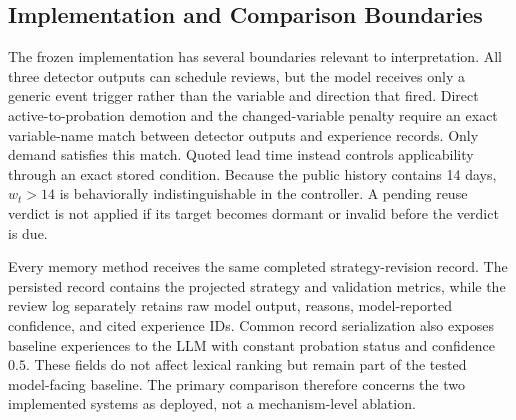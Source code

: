 \subsection{Implementation and Comparison Boundaries}
\label{sec:method-boundaries}

The frozen implementation has several boundaries relevant to interpretation.
All three detector outputs can schedule reviews, but the model receives only a
generic event trigger rather than the variable and direction that fired. Direct
active-to-probation demotion and the changed-variable penalty require an exact
variable-name match between detector outputs and experience records. Only
demand satisfies this match. Quoted lead time instead controls applicability
through an exact stored condition. Because the public history contains 14 days,
$w_t>14$ is behaviorally indistinguishable in the controller. A pending reuse
verdict is not applied if its target becomes dormant or invalid before the
verdict is due.

Every memory method receives the same completed strategy-revision record. The
persisted record contains the projected strategy and validation metrics, while
the review log separately retains raw model output, reasons, model-reported
confidence, and cited experience IDs. Common record serialization also exposes
baseline experiences to the LLM with constant probation status and confidence
$0.5$. These fields do not affect lexical ranking but remain part of the tested
model-facing baseline. The primary comparison therefore concerns the two
implemented systems as deployed, not a mechanism-level ablation.
